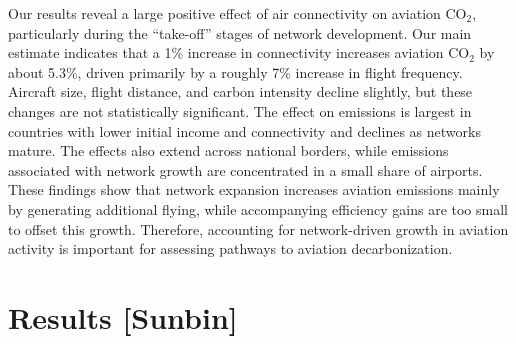 \documentclass[12pt]{article}
\begin{document}
Our results reveal a large positive effect of air connectivity on
aviation CO$_2$, particularly during the ``take-off'' stages of network
development. Our main estimate indicates that a 1\% increase in
connectivity increases aviation CO$_2$ by about 5.3\%, driven primarily
by a roughly 7\% increase in flight frequency. Aircraft size, flight
distance, and carbon intensity decline slightly, but these changes are
not statistically significant. The effect on emissions is largest in
countries with lower initial income and connectivity and declines as
networks mature. The effects also extend across national borders, while
emissions associated with network growth are concentrated in a small
share of airports. These findings show that network expansion increases
aviation emissions mainly by generating additional flying, while
accompanying efficiency gains are too small to offset this growth.
Therefore, accounting for network-driven growth in aviation activity is
important for assessing pathways to aviation decarbonization.

\section*{Results [Sunbin]}
\end{document}
